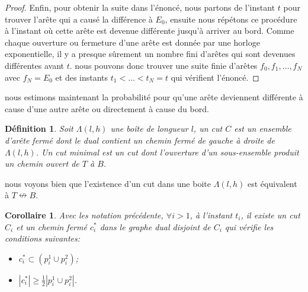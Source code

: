 \documentclass[titlepage,a4paper,12pt]{article}
\newcounter{def}
\newcounter{cor}
\newtheorem{cut}[def]{Définition}
\newtheorem{bcut}[cor]{Corollaire}
\begin{document}
\begin{proof}
Enfin, pour obtenir la suite dans l'énoncé, nous partons de l'instant $t$ pour trouver l'arête qui a causé la différence à $E_0$, ensuite nous répétons ce procédure à l'instant où cette arête est devenue différente jusqu'à arriver au bord. Comme chaque ouverture ou fermeture d'une arête est donnée par une horloge exponentielle, il y a presque sûrement un nombre fini d'arêtes qui sont devenues différentes avant $t$. nous pouvons donc trouver une suite finie d'arêtes $f_0,f_1,\dots, f_N$ avec $f_N = E_0$ et des instants $t_1<\dots< t_N = t$ qui vérifient l'énoncé.
\end{proof}

nous estimons maintenant la probabilité pour qu'une arête deviennent différente à cause d'une autre arête ou directement à cause du bord. 

\begin{cut}
Soit $\Lambda(l,h)$ une boîte de longueur $l$, un cut $C$ est un ensemble d'arête fermé dont le dual contient un chemin fermé de gauche à droite de $\Lambda(l,h)$. Un cut minimal est un cut dont l'ouverture d'un sous-ensemble produit un chemin ouvert de $T$ à $B$.
\end{cut}

nous voyons bien que l'existence d'un cut dans une boite $\Lambda(l,h)$ est équivalent à $T\nleftrightarrow B$.

\begin{bcut}
Avec les notation précédente, $\forall i>1$, à l'instant $t_i$, il existe un cut $C_i$ et un chemin fermé $c_i^*$ dans le graphe dual disjoint de $C_i$ qui vérifie les conditions suivantes:
\begin{itemize}
\item $c^*_i \subset (p_i^1\cup p_i^2)$;
\item $|c^*_i| \geqslant \frac{1}{2}|p_i^1\cup p_i^2|$.
\end{itemize}
\end{bcut}
\end{document}
